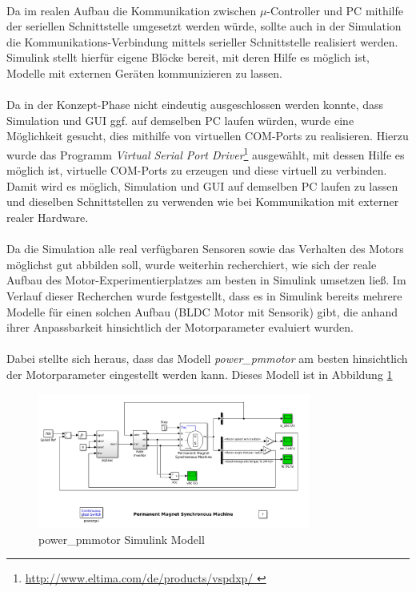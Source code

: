 \paragraph{}
Da im realen Aufbau die Kommunikation zwischen $\mu$-Controller und PC mithilfe der seriellen Schnittstelle umgesetzt werden würde, sollte auch in der Simulation die Kommunikations-Verbindung mittels serieller Schnittstelle realisiert werden. 
Simulink stellt hierfür eigene Blöcke bereit, mit deren Hilfe es möglich ist, Modelle mit externen Geräten kommunizieren zu lassen.

\paragraph{}
Da in der Konzept-Phase nicht eindeutig ausgeschlossen werden konnte, dass Simulation und GUI ggf. auf demselben PC laufen würden, wurde eine Möglichkeit gesucht, dies mithilfe von virtuellen COM-Ports zu realisieren. 
Hierzu wurde das Programm \textit{Virtual Serial Port Driver}\footnote{\url{http://www.eltima.com/de/products/vspdxp/ }}
ausgewählt, mit dessen Hilfe es möglich ist, virtuelle COM-Ports zu erzeugen und diese virtuell zu verbinden. Damit wird es möglich, Simulation und GUI auf demselben PC laufen zu lassen und dieselben Schnittstellen zu verwenden wie bei Kommunikation mit externer realer Hardware.

\paragraph{}
Da die Simulation alle real verfügbaren Sensoren sowie das Verhalten des Motors möglichst gut abbilden soll, wurde weiterhin recherchiert, wie sich der reale Aufbau des Motor-Experimentierplatzes am besten in Simulink umsetzen ließ. Im Verlauf dieser Recherchen wurde festgestellt, dass es in Simulink bereits mehrere Modelle für einen solchen Aufbau (BLDC Motor mit Sensorik) gibt, die anhand ihrer Anpassbarkeit hinsichtlich der Motorparameter evaluiert wurden. 

\paragraph{}
Dabei stellte sich heraus, dass das Modell \textit{power\_pmmotor} am besten hinsichtlich der Motorparameter eingestellt werden kann. 
Dieses Modell ist in Abbildung \ref{FigPowerPmmotor}
\begin{figure}[htbp]
	\centering
	\includegraphics[width=0.8\textwidth]{./sim/pictures/powerPmmotor.png}
	\caption{power\_pmmotor Simulink Modell}
	\label{FigPowerPmmotor}
\end{figure}

